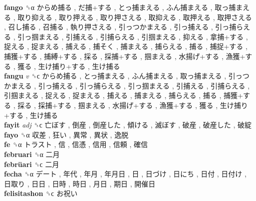 \textbf{fango} ␝α   からめ捕る ,  だ捕+する ,  とっ捕まえる ,  ふん捕まえる ,  取っ捕まえる ,  取り抑える ,  取り押える ,  取り押さえる ,  取抑える ,  取押える ,  取押さえる ,  召し捕る ,  召捕る ,  執り押さえる ,  引っつかまえる ,  引っ捕える ,  引っ捕らえる ,  引っ掴まえる ,  引捕える ,  引捕らえる ,  引掴まえる ,  抑える ,  拿捕+する ,  捉える ,  捉まえる ,  捕える ,  捕そく ,  捕まえる ,  捕らえる ,  捕る ,  捕捉+する ,  捕獲+する ,  捕縛+する ,  採る ,  採捕+する ,  掴まえる ,  水揚げ+する ,  漁獲+する ,  獲る ,  生け捕り+する ,  生け捕る   \\
\textbf{fangu} \emph{v}  ␝ϲ   からめ捕る ,  とっ捕まえる ,  ふん捕まえる ,  取っ捕まえる ,  引っつかまえる ,  引っ捕える ,  引っ捕らえる ,  引っ掴まえる ,  引捕える ,  引捕らえる ,  引掴まえる ,  捉える ,  捉まえる ,  捕える ,  捕まえる ,  捕らえる ,  捕る ,  捕獲+する ,  採る ,  採捕+する ,  掴まえる ,  水揚げ+する ,  漁獲+する ,  獲る ,  生け捕り+する ,  生け捕る   \\
\textbf{fayit} \emph{adj}  ␝ϲ   亡ぼす ,  倒産 ,  倒産した ,  傾ける ,  滅ぼす ,  破産 ,  破産した ,  破綻   \\
\textbf{fayo} ␝α   収差 ,  狂い ,  異常 ,  異状 ,  逸脱   \\
\textbf{fe} ␝α   トラスト ,  信 ,  信憑 ,  信用 ,  信頼 ,  確信   \\
\textbf{februari} ␝α   二月   \\
\textbf{febrüari} ␝ϲ   二月   \\
\textbf{fecha} ␝α   デート ,  年代 ,  年月 ,  年月日 ,  日 ,  日づけ ,  日にち ,  日付 ,  日付け ,  日取り ,  日日 ,  日時 ,  時日 ,  月日 ,  期日 ,  開催日   \\
\textbf{felisitashon} ␝ϲ   お祝い   \\
